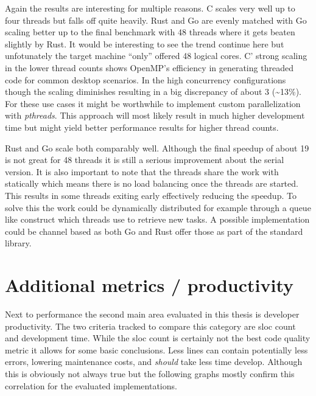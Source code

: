 Again the results are interesting for multiple reasons. C scales very well up to four threads but falls off quite heavily. Rust and Go are evenly matched with Go scaling better up to the final benchmark with 48 threads where it gets beaten slightly by Rust. It would be interesting to see the trend continue here but unfotunately the target machine ``only'' offered 48 logical cores. C' strong scaling in the lower thread counts shows OpenMP's efficiency in generating threaded code for common desktop scenarios. In the high concurrency configurations though the scaling diminishes resulting in a big discrepancy of about 3 (\textasciitilde13\%). For these use cases it might be worthwhile to implement custom parallelization with \textit{pthreads}. This approach will most likely result in much higher development time but might yield better performance results for higher thread counts.

Rust and Go scale both comparably well. Although the final speedup of about 19 is not great for 48 threads it is still a serious improvement about the serial version. It is also important to note that the threads share the work with statically which means there is no load balancing once the threads are started. This results in some threads exiting early effectively reducing the speedup. To solve this the work could be dynamically distributed for example through a queue like construct which threads use to retrieve new tasks. A possible implementation could be channel based as both Go and Rust offer those as part of the standard library.

\section{Additional metrics / productivity}
\label{sec:Evaluation::Metrics}

Next to performance the second main area evaluated in this thesis is developer productivity. The two criteria tracked to compare this category are \gls{sloc} count and development time. While the \gls{sloc} count is certainly not the best code quality metric it allows for some basic conclusions. Less lines can contain potentially less errors, lowering maintenance costs, and \textit{should} take less time develop. Although this is obviously not always true but the following graphs mostly confirm this correlation for the evaluated implementations.

